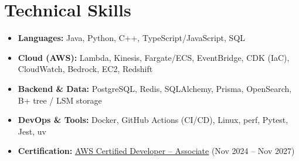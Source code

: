 \documentclass[letterpaper,10pt]{article}
\begin{document}
\section{Technical Skills}
\begin{itemize}[leftmargin=0in, label={}, itemsep=0pt, topsep=2pt]
  \small
  \item{\textbf{Languages:} Java, Python, C++, TypeScript/JavaScript, SQL}
  \item{\textbf{Cloud (AWS):} Lambda, Kinesis, Fargate/ECS, EventBridge, CDK (IaC), CloudWatch, Bedrock, EC2, Redshift}
  \item{\textbf{Backend \& Data:} PostgreSQL, Redis, SQLAlchemy, Prisma, OpenSearch, B+ tree / LSM storage}
  \item{\textbf{DevOps \& Tools:} Docker, GitHub Actions (CI/CD), Linux, perf, Pytest, Jest, uv}
  \item{\textbf{Certification:} \href{https://www.credly.com/badges/d2406a97-d937-47de-823b-724981159d3b/public_url}{\underline{AWS Certified Developer -- Associate}} (Nov 2024 -- Nov 2027)}
\end{itemize}
\end{document}
